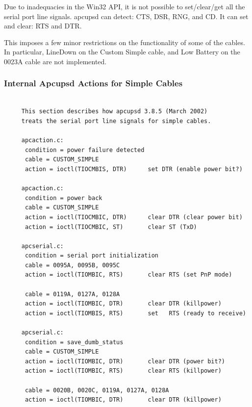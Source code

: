 {{{{{{{{{{\label{index-Cables-213}
\label{index-Windows-214}
Due to inadequacies in the Win32 API, it is not possible to set/clear/get all
the serial port line signals. apcupsd can detect: CTS, DSR, RNG, and CD. It
can set and clear: RTS and DTR.  

This imposes a few minor restrictions on the functionality of some of the
cables. In particular, LineDown on the Custom Simple cable, and Low Battery on
the 0023A cable are not implemented. 

\label{Internal-Apcupsd-Actions-for-Simple-Cables}

\subsubsection*{Internal Apcupsd Actions for Simple Cables}

\label{index-Cables-215}

\footnotesize
\begin{verbatim}
     
     This section describes how apcupsd 3.8.5 (March 2002)
     treats the serial port line signals for simple cables.
     
     apcaction.c:
      condition = power failure detected
      cable = CUSTOM_SIMPLE
      action = ioctl(TIOCMBIS, DTR)      set DTR (enable power bit?)
     
     apcaction.c:
      condition = power back
      cable = CUSTOM_SIMPLE
      action = ioctl(TIOCMBIC, DTR)      clear DTR (clear power bit)
      action = ioctl(TIOCMBIC, ST)       clear ST (TxD)
     
     apcserial.c:
      condition = serial port initialization
      cable = 0095A, 0095B, 0095C
      action = ioctl(TIOMBIC, RTS)       clear RTS (set PnP mode)
     
      cable = 0119A, 0127A, 0128A
      action = ioctl(TIOMBIC, DTR)       clear DTR (killpower)
      action = ioctl(TIOMBIS, RTS)       set   RTS (ready to receive)
     
     apcserial.c:
      condition = save_dumb_status
      cable = CUSTOM_SIMPLE
      action = ioctl(TIOMBIC, DTR)       clear DTR (power bit?)
      action = ioctl(TIOMBIC, RTS)       clear RTS (killpower)
     
      cable = 0020B, 0020C, 0119A, 0127A, 0128A
      action = ioctl(TIOMBIC, DTR)       clear DTR (killpower)
     

\end{verbatim}}}}}}}}}}}
